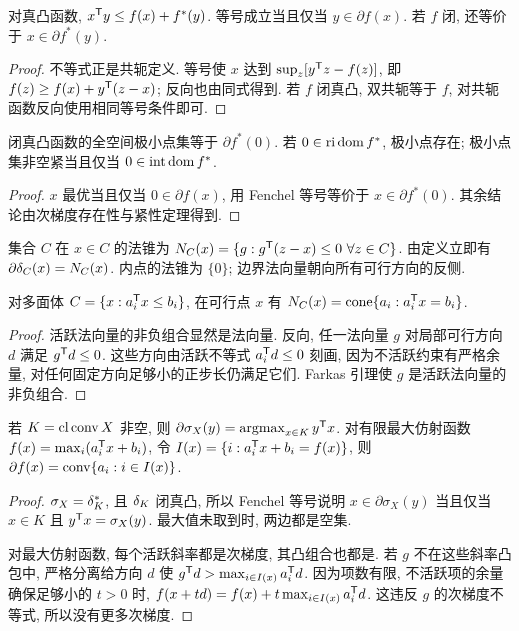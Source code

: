 \begin{theorem}\label{thm:fenchel-equality}
对真凸函数, $x^{\mathsf T} y\le f(x)+f^*(y)$. 等号成立当且仅当 $y\in\partial f(x)$. 若 $f$ 闭, 还等价于 $x\in\partial f^*(y)$.
\end{theorem}
\begin{proof}
不等式正是共轭定义. 等号使 $x$ 达到 $\sup_z[y^{\mathsf T} z-f(z)]$, 即 $f(z)\ge f(x)+y^{\mathsf T}(z-x)$; 反向也由同式得到. 若 $f$ 闭真凸, 双共轭等于 $f$, 对共轭函数反向使用相同等号条件即可.
\end{proof}
\begin{corollary}
闭真凸函数的全空间极小点集等于 $\partial f^*(0)$. 若 $0\in\operatorname{ri}\operatorname{dom} f^*$, 极小点存在; 极小点集非空紧当且仅当 $0\in\operatorname{int}\operatorname{dom} f^*$.
\end{corollary}
\begin{proof}
$x$ 最优当且仅当 $0\in\partial f(x)$, 用 Fenchel 等号等价于 $x\in\partial f^*(0)$. 其余结论由次梯度存在性与紧性定理得到.
\end{proof}

集合 $C$ 在 $x\in C$ 的法锥为 $N_C(x)=\{g:g^{\mathsf T}(z-x)\le0\ \forall z\in C\}$. 由定义立即有 $\partial\delta_{C}(x)=N_C(x)$. 内点的法锥为 $\{0\}$; 边界法向量朝向所有可行方向的反侧.

\begin{proposition}\label{prop:poly-normal}
对多面体 $C=\{x:a_i^{\mathsf T} x\le b_i\}$, 在可行点 $x$ 有 $N_C(x)=\operatorname{cone}\{a_i:a_i^{\mathsf T} x=b_i\}$.
\end{proposition}
\begin{proof}
活跃法向量的非负组合显然是法向量. 反向, 任一法向量 $g$ 对局部可行方向 $d$ 满足 $g^{\mathsf T} d\le0$. 这些方向由活跃不等式 $a_i^{\mathsf T} d\le0$ 刻画, 因为不活跃约束有严格余量, 对任何固定方向足够小的正步长仍满足它们. Farkas 引理使 $g$ 是活跃法向量的非负组合.
\end{proof}
\begin{proposition}
若 $K=\operatorname{cl}\operatorname{conv} X$ 非空, 则 $\partial\sigma_X(y)=\operatorname{argmax}_{x\in K}y^{\mathsf T} x$. 对有限最大仿射函数 $f(x)=\max_i(a_i^{\mathsf T} x+b_i)$, 令 $I(x)=\{i:a_i^{\mathsf T} x+b_i=f(x)\}$, 则 $\partial f(x)=\operatorname{conv}\{a_i:i\in I(x)\}$.
\end{proposition}
\begin{proof}
$\sigma_X=\delta_{K}^*$, 且 $\delta_{K}$ 闭真凸, 所以 Fenchel 等号说明 $x\in\partial\sigma_X(y)$ 当且仅当 $x\in K$ 且 $y^{\mathsf T} x=\sigma_X(y)$. 最大值未取到时, 两边都是空集.

对最大仿射函数, 每个活跃斜率都是次梯度, 其凸组合也都是. 若 $g$ 不在这些斜率凸包中, 严格分离给方向 $d$ 使 $g^{\mathsf T} d>\max_{i\in I(x)}a_i^{\mathsf T} d$. 因为项数有限, 不活跃项的余量确保足够小的 $t>0$ 时, $f(x+td)=f(x)+t\max_{i\in I(x)}a_i^{\mathsf T} d$. 这违反 $g$ 的次梯度不等式, 所以没有更多次梯度.
\end{proof}

